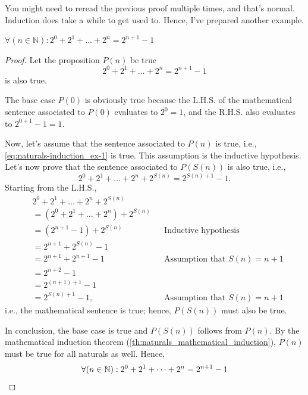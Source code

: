 You might need to reread the previous proof multiple times, and that's normal. Induction does take a
while to get used to. Hence, I've prepared another example.

\begin{prop}{}{}
  \(\forall (n \in \mathbb{N}) : 2^0 + 2^1 + \dots + 2^n = 2^{n+1} - 1\)
\end{prop}

\begin{proof}
  Let the proposition \(P(n)\) be true \ifft
  \begin{equation}
    2^0 + 2^1 + \dots + 2^n = 2^{n+1} - 1 \label{eq:naturals-induction_ex-1}
  \end{equation}
  is also true.

  \basecase The base case \(P(0)\) is obviously true because the L.H.S. of the mathematical sentence
  associated to \(P(0)\) evaluates to \(2^0 = 1\), and the R.H.S. also evaluates to
  \(2^{0+1} - 1 = 1\).

  \inductivestep Now, let's assume that the sentence associated to \(P(n)\) is true, i.e.,
  \cref{eq:naturals-induction_ex-1} is true. This assumption is the inductive hypothesis. Let's now
  prove that the sentence associated to \(P(S(n))\) is also true, i.e.,
  \begin{equation}
    2^0 + 2^1 + \dots + 2^n + 2^{S(n)} = 2^{S(n)+1} - 1.
  \end{equation}
  Starting from the L.H.S.,
  \begin{align*}
    & 2^0 + 2^1 + \dots + 2^n + 2^{S(n)}                                                    \\
    & = (2^0 + 2^1 + \dots + 2^n) + 2^{S(n)}                                                \\
    & = (2^{n+1} - 1) + 2^{S(n)}             &  & \textrm{Inductive hypothesis}             \\
    & = 2^{n+1} + 2^{S(n)} - 1                                                              \\
    & = 2^{n+1} + 2^{n+1} - 1                &  & \textrm{Assumption that \(S(n) = n + 1\)} \\
    & = 2^{n+2} - 1                                                                         \\
    & = 2^{(n+1)+1} - 1                                                                     \\
    & = 2^{S(n)+1} - 1,                      &  & \textrm{Assumption that \(S(n) = n + 1\)}
  \end{align*}
  i.e., the mathematical sentence is true; hence, \(P(S(n))\) must also be true.

  In conclusion, the base case is true and \(P(S(n))\) follows from \(P(n)\). By the mathematical
  induction theorem (\cref{th:naturals_mathematical_induction}), \(P(n)\) must be true for all
  naturals as well. Hence,
  \begin{equation*}
    \forall(n \in \mathbb{N}) : 2^0 + 2^1 + \dots + 2^n = 2^{n+1} - 1 \qedhere
  \end{equation*}
\end{proof}

